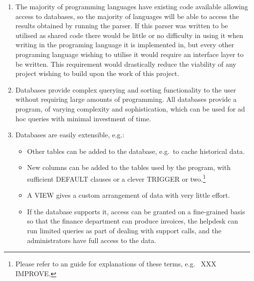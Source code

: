 \documentclass[a4paper,12pt,draft]{article}
\begin{document}
\begin{enumerate}

    \item The majority of programming languages have existing code
        available allowing access to databases, so the majority of
        languages will be able to access the results obtained by running
        the parser.  If this parser was written to be utilised as shared
        code there would be little or no difficulty in using it when
        writing in the programing language it is implemented in, but every
        other programing language wishing to utilise it would require an
        interface layer to be written.  This requirement would drastically
        reduce the viability of any project wishing to build upon the work
        of this project.

    \item Databases provide complex querying and sorting functionality to
        the user without requiring large amounts of programming.  All
        databases provide a program, of varying complexity and
        sophistication, which can be used for ad hoc queries with minimal
        investment of time.

    \item Databases are easily extensible, e.g.:
        
        \begin{itemize}

            \item Other tables can be added to the database, e.g.\ to cache
                historical data.

            \item New columns can be added to the tables used by the
                program, with sufficient DEFAULT clauses or a clever
                TRIGGER or two.\footnote{Please refer to an \SQL{} guide
                for explanations of these terms, e.g.~\cite{wikipedia-sql}
                XXX IMPROVE.}

            \item A VIEW gives a custom arrangement of data with very
                little effort.

            \item If the database supports it, access can be granted on a
                fine-grained basis so that the finance department can
                produce invoices, the helpdesk can run limited queries as
                part of dealing with support calls, and the administrators
                have full access to the data.


\end{itemize}
\end{enumerate}
\end{document}
